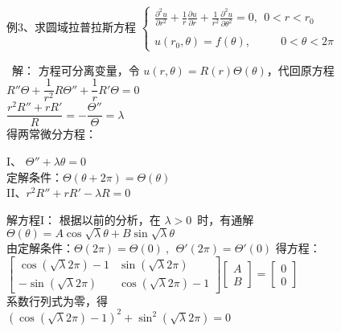 \begin{frame}	
	\begin{exampleblock} {例3、求圆域拉普拉斯方程}
	{ $  \displaystyle  \left \{ 
	\begin{array}{cc}
		\displaystyle {	\frac{\partial^2 u }{\partial r^2 } +\frac{1}{r } \frac{\partial u }{\partial r } +
			\frac{1}{r^2 } \frac{\partial ^2 u }{\partial \theta ^2
		} } =0, ~~ 0<r<r_0\\
		\\
		u(r_0,\theta )=f(\theta ) ,~~~~~~~~~~~~ 0<\theta <2\pi 
	\end{array}
	\right. $}  
	\end{exampleblock}	
	\alert{ 解：}	 
	方程可分离变量，令 $\displaystyle  u(r,\theta)=R(r) \Theta(\theta)$，代回原方程  \\ 
	{ $\displaystyle  R''\Theta +\dfrac{1}{r^2} R\Theta '' +\dfrac{1}{r}R'\Theta=0 $} \\ 
	{ $\displaystyle  \dfrac{r^2R''+rR'}{R}=-\dfrac{\Theta '' }{\Theta} =\lambda $} \\ 
	得两常微分方程：
\end{frame}	

\begin{frame}	
	I、 $\displaystyle 	\Theta '' + \lambda \theta =0 $  \\ 
	定解条件：$\displaystyle 	\Theta(\theta +2 \pi )=\Theta (\theta)  $  \\ 
	II、$\displaystyle  r^2 R'' +r R' -\lambda R =0 $  \\   \vspace{0.6 cm}	
	
	解方程I：  根据以前的分析，在 $\lambda > 0 $ 时，有通解\\ 
	{ $\displaystyle  \Theta(\theta)=A\cos \sqrt{\lambda } \theta+B\sin \sqrt{\lambda }\theta$}\\ 
	由定解条件：$\displaystyle 	\Theta(2 \pi )=\Theta (0)~,~~ 	\Theta' (2 \pi )=\Theta' (0)  $ 得方程： \\ 
	$ \left [
	\begin{array}{lll}
		\cos (\sqrt {\lambda} 2\pi )-1  & \sin (\sqrt {\lambda} 2\pi )\\
		-\sin (\sqrt {\lambda} 2\pi ) & \cos (\sqrt {\lambda} 2\pi )-1
	\end{array} \right] 
	\left [
	\begin{array}{lll}
		A\\
		B
	\end{array} \right] 
	=
	\left [
	\begin{array}{lll}
		0\\
		0
	\end{array} \right]
	$ \\
	系数行列式为零，得\\
	$(\cos (\sqrt {\lambda} 2\pi )-1 ) ^2 + \sin ^2 (\sqrt {\lambda} 2\pi ) =0$ \\ 
\end{frame}	

